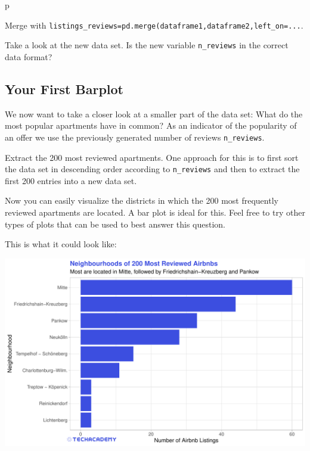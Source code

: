 \documentclass[
  11pt,
]{book}
\begin{document}
\begin{tipsp}p

Merge with
\texttt{listings\_reviews=pd.merge(dataframe1,dataframe2,left\_on=...}.

\end{tipsp}

Take a look at the new data set. Is the new variable \texttt{n\_reviews}
in the correct data format?

\hypertarget{your-first-barplot}{%
\subsection{Your First Barplot}\label{your-first-barplot}}

We now want to take a closer look at a smaller part of the data set:
What do the most popular apartments have in common? As an indicator of
the popularity of an offer we use the previously generated number of
reviews \texttt{n\_reviews}.

Extract the 200 most reviewed apartments. One approach for this is to
first sort the data set in descending order according to
\texttt{n\_reviews} and then to extract the first 200 entries into a new
data set.

Now you can easily visualize the districts in which the 200 most
frequently reviewed apartments are located. A bar plot is ideal for
this. Feel free to try other types of plots that can be used to best
answer this question.

This is what it could look like:

\begin{center}\includegraphics[width=1\linewidth]{plot/3_3_Barplot_MostReviewed} \end{center}
\end{document}
